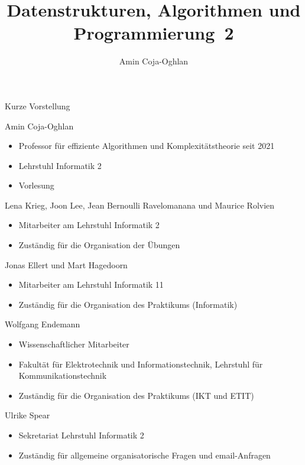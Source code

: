 \documentclass[aspectratio=1610, 11pt]{beamer}
\title{Datenstrukturen, Algorithmen und Programmierung~2}
\author[A.~Coja-Oghlan]{Amin Coja-Oghlan}
\institute[DAP2]{Lehrstuhl Informatik 2\\Fakult\"at f\"ur Informatik}
\begin{document}
\maketitle

\begin{frame}{Kurze Vorstellung}
	\begin{overprint}
		\begin{exampleblock}{Amin Coja-Oghlan}
		\begin{itemize}
			\item Professor f\"ur effiziente Algorithmen und Komplexit\"atstheorie seit 2021
			\item Lehrstuhl Informatik 2
			\item Vorlesung
		\end{itemize}
	\end{exampleblock}
	\begin{exampleblock}{Lena Krieg, Joon Lee, Jean Bernoulli Ravelomanana und Maurice Rolvien}
		\begin{itemize}
			\item Mitarbeiter am Lehrstuhl Informatik 2
			\item Zust\"andig f\"ur die Organisation der \"Ubungen
		\end{itemize}
	\end{exampleblock}
	\begin{exampleblock}{Jonas Ellert und Mart Hagedoorn}
		\begin{itemize}
			\item Mitarbeiter am Lehrstuhl Informatik 11
			\item Zust\"andig f\"ur die Organisation des Praktikums (Informatik)
		\end{itemize}
	\end{exampleblock}
	\begin{exampleblock}{Wolfgang Endemann}
		\begin{itemize}
			\item Wissenschaftlicher Mitarbeiter
			\item Fakult\"at für Elektrotechnik und Informationstechnik, Lehrstuhl für Kommunikationstechnik
			\item Zust\"andig f\"ur die Organisation des Praktikums (IKT und ETIT)
		\end{itemize}
	\end{exampleblock}
	\begin{exampleblock}{Ulrike Spear}
		\begin{itemize}
			\item Sekretariat Lehrstuhl Informatik 2
			\item Zust\"andig f\"ur allgemeine organisatorische Fragen und email-Anfragen
		\end{itemize}
	\end{exampleblock}
	\end{overprint}
\end{frame}
\end{document}

